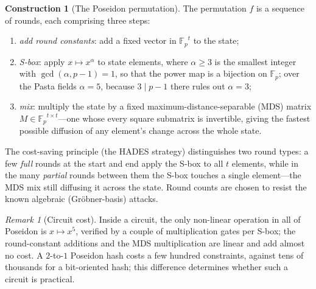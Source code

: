 \documentclass[11pt,a4paper]{article}
\theoremstyle{definition}
\newtheorem{construction}[theorem]{Construction}
\theoremstyle{remark}
\newtheorem{remark}[theorem]{Remark}
\newcommand{\Fp}{\ensuremath{\mathbb{F}_{p}}}
\begin{document}
\begin{construction}[The Poseidon permutation]\label{hash:con:poseidon}
The permutation \(f\) is a sequence of rounds, each comprising three
steps:
\begin{enumerate}
\item \emph{add round constants}: add a fixed vector in \(\Fp^{t}\)
  to the state;
\item \emph{S-box}: apply \(x \mapsto x^{\alpha}\) to state elements,
  where \(\alpha \ge 3\) is the smallest integer with
  \(\gcd(\alpha, p - 1) = 1\), so that the power map is a bijection
  on \(\Fp\); over the Pasta fields \(\alpha = 5\), because
  \(3 \mid p - 1\) there rules out \(\alpha = 3\);
\item \emph{mix}: multiply the state by a fixed
  maximum-distance-separable (MDS) matrix
  \(M \in \Fp^{t \times t}\)---one whose every square submatrix is
  invertible, giving the fastest possible diffusion of any element's
  change across the whole state.
\end{enumerate}
The cost-saving principle (the HADES strategy) distinguishes two
round types: a few \emph{full} rounds at the start and end apply the
S-box to all \(t\) elements, while in the many \emph{partial} rounds
between them the S-box touches a single element---the MDS mix still
diffusing it across the state. Round counts are chosen to resist the
known algebraic (Gr\"obner-basis) attacks.
\end{construction}

\begin{remark}[Circuit cost]\label{hash:rem:poseidon-cost}
Inside a circuit, the only non-linear operation in all of Poseidon is
\(x \mapsto x^{5}\), verified by a couple of multiplication gates per
S-box; the round-constant additions and the MDS multiplication are
linear and add almost no cost. A \(2\)-to-\(1\) Poseidon hash costs a
few hundred constraints, against tens of thousands for a bit-oriented
hash; this difference determines whether such a circuit is practical.
\end{remark}
\end{document}
